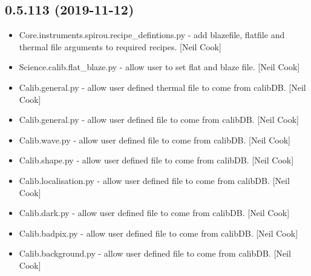 \documentclass[a4paper,10pt,english]{report}
\begin{document}
\subsection{0.5.113 (2019-11-12)}
\label{\detokenize{misc/changelog:id28}}\begin{itemize}
\item {} 
Core.instruments.spirou.recipe\_defintions.py - add blazefile, flatfile
and thermal file arguments to required recipes. {[}Neil Cook{]}

\item {} 
Science.calib.flat\_blaze.py - allow user to set flat and blaze file.
{[}Neil Cook{]}

\item {} 
Calib.general.py - allow user defined thermal file to come from
calibDB. {[}Neil Cook{]}

\item {} 
Calib.general.py - allow user defined file to come from calibDB. {[}Neil
Cook{]}

\item {} 
Calib.wave.py - allow user defined file to come from calibDB. {[}Neil
Cook{]}

\item {} 
Calib.shape.py - allow user defined file to come from calibDB. {[}Neil
Cook{]}

\item {} 
Calib.localisation.py - allow user defined file to come from calibDB.
{[}Neil Cook{]}

\item {} 
Calib.dark.py - allow user defined file to come from calibDB. {[}Neil
Cook{]}

\item {} 
Calib.badpix.py - allow user defined file to come from calibDB. {[}Neil
Cook{]}

\item {} 
Calib.background.py - allow user defined file to come from calibDB.
{[}Neil Cook{]}

\end{itemize}
\end{document}
